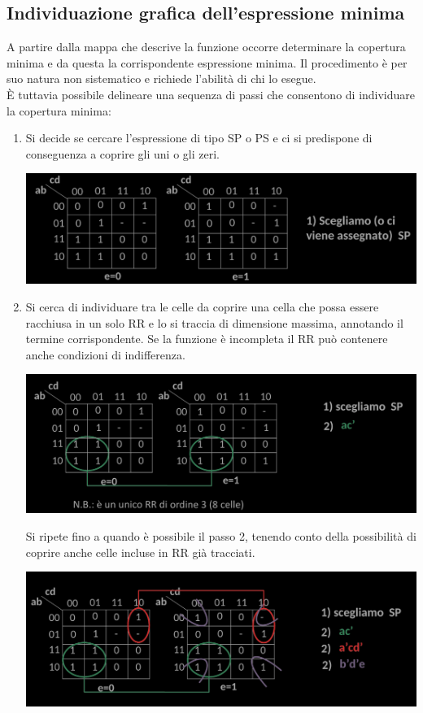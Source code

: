 \documentclass{article}
\begin{document}
\subsection{Individuazione grafica dell'espressione minima}
A partire dalla mappa che descrive la funzione occorre determinare la copertura minima e da questa la corrispondente espressione minima. Il procedimento è per suo natura non sistematico e richiede l'abilità di chi lo esegue.\\
È tuttavia possibile delineare una sequenza di passi che consentono di individuare la copertura minima:
\begin{enumerate}
    \item Si decide se cercare l'espressione di tipo SP o PS e ci si predispone di conseguenza a coprire gli uni o gli zeri.
    \begin{center}
        \includegraphics[scale=0.55]{ind1}
    \end{center}
    \item Si cerca di individuare tra le celle da coprire una cella che possa essere racchiusa in un solo RR e lo si traccia di dimensione massima, annotando il termine corrispondente. Se la funzione è incompleta il RR può contenere anche condizioni di indifferenza.
    \begin{center}
    \includegraphics[scale=0.55]{ind2}
    \end{center}
    Si ripete fino a quando è possibile il passo 2, tenendo conto della possibilità di coprire anche celle incluse in RR già tracciati.
    \begin{center}
    \includegraphics[scale=0.55]{ind2.1.png}

\end{center}
\end{enumerate}
\end{document}
